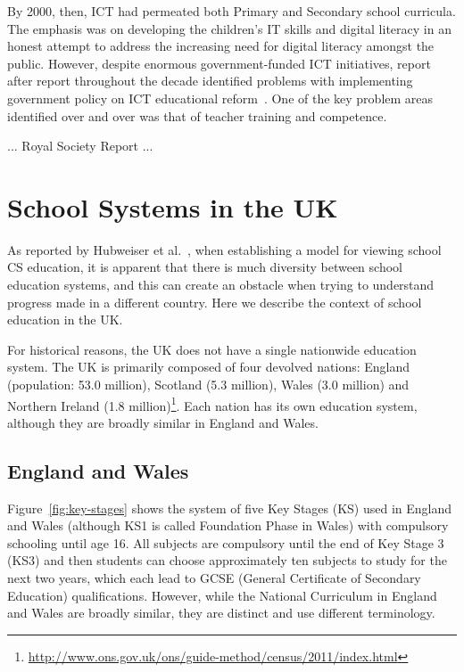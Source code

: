 \documentclass{sig-alternate}
\begin{document}
By 2000, then, ICT had permeated both
Primary and Secondary school curricula.
The emphasis was on developing the children's
IT skills and digital literacy in an honest
attempt to address the increasing need for
digital literacy amongst the public.
However, despite enormous government-funded ICT initiatives,
report after report throughout the decade identified
problems with implementing government policy on ICT educational
reform~\cite{OpieFukuyo:2000,Ofsted:2001,Ofsted:2002,Ofsted:2004,
Loveless:2005,Younie:2006}.
One of the key problem areas identified over and over
was that of teacher training and competence.

... Royal Society Report ...

\section{School Systems in the UK}\label{sec:schools}

As reported by Hubweiser et al.~\cite{hubwieser-et-al:2011}, when establishing a
model for viewing school CS education, it is apparent that there is
much diversity between school education systems, and this can create
an obstacle when trying to understand progress made in a different
country. Here we describe the context of school education in the UK.

For historical reasons, the UK does not have a single nationwide
education system.  The UK is primarily composed of four devolved
nations: England (population: 53.0 million), Scotland (5.3 million),
Wales (3.0 million) and Northern Ireland (1.8
million)\footnote{\url{http://www.ons.gov.uk/ons/guide-method/census/2011/index.html}}.
Each nation has its own education system, although they are broadly
similar in England and Wales.

\subsection{England and Wales}
Figure~\ref{fig:key-stages} shows the system of five Key Stages (KS)
used in England and Wales (although KS1 is called Foundation Phase in
Wales) with compulsory schooling until age 16. All subjects are
compulsory until the end of Key Stage 3 (KS3) and then students can
choose approximately ten subjects to study for the next two years,
which each lead to GCSE (General Certificate of Secondary Education)
qualifications. However, while the National Curriculum in England and
Wales are broadly similar, they are distinct and use different
terminology.
\end{document}
